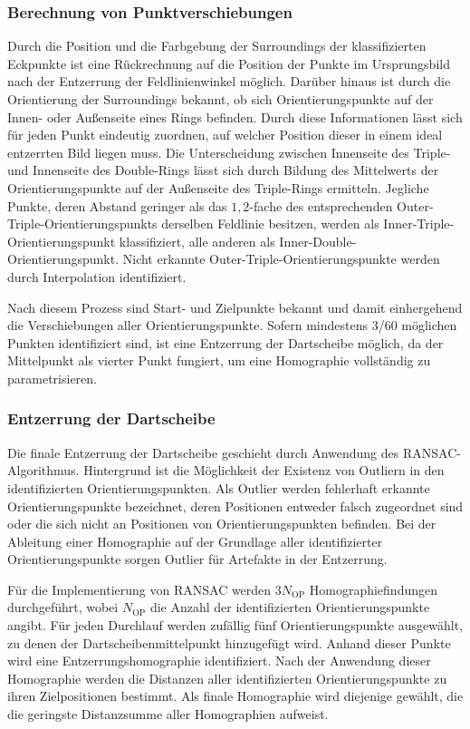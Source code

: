 \subsubsection{Berechnung von Punktverschiebungen}
\label{sec:punktverschiebungen}

Durch die Position und die Farbgebung der Surroundings der klassifizierten Eckpunkte ist eine Rückrechnung auf die Position der Punkte im Ursprungsbild nach der Entzerrung der Feldlinienwinkel möglich. Darüber hinaus ist durch die Orientierung der Surroundings bekannt, ob sich Orientierungspunkte auf der Innen- oder Außenseite eines Rings befinden. Durch diese Informationen lässt sich für jeden Punkt eindeutig zuordnen, auf welcher Position dieser in einem ideal entzerrten Bild liegen muss. Die Unterscheidung zwischen Innenseite des Triple- und Innenseite des Double-Rings lässt sich durch Bildung des Mittelwerts der Orientierungspunkte auf der Außenseite des Triple-Rings ermitteln. Jegliche Punkte, deren Abstand geringer als das $1,\!2$-fache des entsprechenden Outer-Triple-Orientierungspunkts derselben Feldlinie besitzen, werden als Inner-Triple-Orientierungspunkt klassifiziert, alle anderen als Inner-Double-Orientierungspunkt. Nicht erkannte Outer-Triple-Orientierungspunkte werden durch Interpolation identifiziert.

Nach diesem Prozess sind Start- und Zielpunkte bekannt und damit einhergehend die Verschiebungen aller Orientierungspunkte. Sofern mindestens 3/60 möglichen Punkten identifiziert sind, ist eine Entzerrung der Dartscheibe möglich, da der Mittelpunkt als vierter Punkt fungiert, um eine Homographie vollständig zu parametrisieren.

\subsubsection{Entzerrung der Dartscheibe}
\label{sec:entzerrung}

Die finale Entzerrung der Dartscheibe geschieht durch Anwendung des RANSAC-Algorithmus. Hintergrund ist die Möglichkeit der Existenz von Outliern in den identifizierten Orientierungspunkten. Als Outlier werden fehlerhaft erkannte Orientierungspunkte bezeichnet, deren Positionen entweder falsch zugeordnet sind oder die sich nicht an Positionen von Orientierungspunkten befinden. Bei der Ableitung einer Homographie auf der Grundlage aller identifizierter Orientierungspunkte sorgen Outlier für Artefakte in der Entzerrung.

Für die Implementierung von RANSAC werden $3 N_\text{OP}$ Homographiefindungen durchgeführt, wobei $N_\text{OP}$ die Anzahl der identifizierten Orientierungspunkte angibt. Für jeden Durchlauf werden zufällig fünf Orientierungspunkte ausgewählt, zu denen der Dartscheibenmittelpunkt hinzugefügt wird. Anhand dieser Punkte wird eine Entzerrungshomographie identifiziert. Nach der Anwendung dieser Homographie werden die Distanzen aller identifizierten Orientierungspunkte zu ihren Zielpositionen bestimmt. Als finale Homographie wird diejenige gewählt, die die geringste Distanzsumme aller Homographien aufweist.

